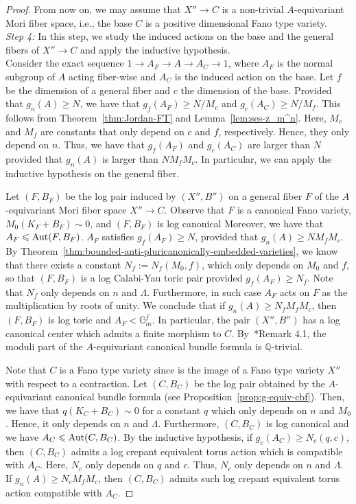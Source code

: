 \documentclass{amsart}
\renewcommand{\qq}{\mathbb{Q}}
\theoremstyle{remark}
\numberwithin{equation}{section}
\begin{document}
\begin{proof}
From now on, we may assume that $X''\rightarrow C$ is a non-trivial $A$-equivariant Mori fiber space, i.e., 
the base $C$ is a positive dimensional Fano type variety.\\

\textit{Step 4:} In this step, we study the induced actions on the base and the general fibers of $X''\rightarrow C$ and apply the inductive hypothesis.\\

Consider the exact sequence
$1\rightarrow A_F \rightarrow A \rightarrow A_C \rightarrow 1$,
where $A_F$ is the normal subgroup of $A$ acting fiber-wise
and $A_C$ is the induced action on the base.
Let $f$ be the dimension of a general fiber and $c$ the dimension of the base.
Provided that $g_n(A)\geq N$, we have that
$g_f(A_F)\geq N/M_c$ and $g_c(A_C)\geq N/M_f$.
This follows from
Theorem~\ref{thm:Jordan-FT}
and 
Lemma~\ref{lem:ses-z_m^n}.
Here, $M_c$ and $M_f$ are constants that only depend on $c$ and $f$, respectively.
Hence, they only depend on $n$.
Thus, we have that $g_f(A_F)$ and $g_c(A_C)$ are larger than $N$ provided
that $g_n(A)$ is larger than $NM_fM_c$.
In particular, we can apply the inductive hypothesis on the general fiber.

Let $(F,B_F)$ be the log pair induced by $(X'',B'')$ on 
a general fiber $F$ of the $A$-equivariant Mori fiber space
$X''\rightarrow C$.
Observe that $F$ is a canonical Fano variety,
$M_0(K_F+B_F)\sim 0$, and $(F,B_F)$ is log canonical
Moreover, we have that $A_F \leqslant {\rm Aut}(F,B_F)$.
$A_F$ satisfies $g_f(A_F)\geq N$, provided that
$g_n(A)\geq NM_fM_c$.
By Theorem~\ref{thm:bounded-anti-pluricanonically-embedded-varieties}, we know that there exists a constant $N_f:=N_f(M_0,f)$, which only depends on $M_0$ and $f$,
so that $(F,B_F)$ is a log Calabi-Yau toric pair 
provided $g_f(A_F)\geq N_f$.
Note that $N_f$ only depends on $n$ and $\Lambda$.
Furthermore, in such case $A_F$ acts on $F$
as the multiplication by roots of unity.
We conclude that
if $g_n(A)\geq N_fM_fM_c$, then 
$(F,B_F)$ is log toric and $A_F<\mathbb{G}_m^f$.
In particular, the pair $(X'',B'')$ has a log canonical
center which admits a finite morphism to $C$.
By~\cite{FG14}*{Remark 4.1}, the moduli part of the $A$-equivariant canonical bundle formula is $\qq$-trivial.

Note that $C$ is a Fano type variety since is the image of a Fano type variety $X''$ with respect to a contraction.
Let $(C,B_C)$ be the log pair obtained by the $A$-equivariant canonical bundle formula (see Proposition~\ref{prop:g-equiv-cbf}).
Then, we have that $q(K_C+B_C)\sim 0$ for a constant
$q$ which only depends on $n$ and $M_0$.
Hence, it only depends on $n$ and $\Lambda$.
Furthermore, $(C,B_C)$ is log canonical
and we have $A_C\leqslant {\rm Aut}(C,B_C)$.
By the inductive hypothesis, 
if $g_c(A_C)\geq N_c(q,c)$, 
then $(C,B_C)$ admits a log crepant equivalent torus
action which is compatible with $A_C$.
Here, $N_c$ only depends on $q$ and $c$.
Thus, $N_c$ only depends on $n$ and $\Lambda$.
If $g_n(A)\geq N_cM_fM_c$, then
$(C,B_C)$ admits such log crepant equivalent torus action
compatible with $A_C$.


\end{proof}
\end{document}
